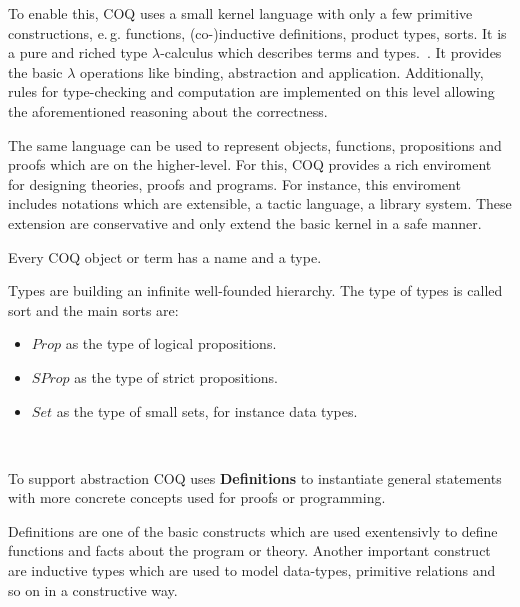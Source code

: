 To enable this, COQ uses a small kernel language with only a few
primitive constructions, e.\,g. functions, (co-)inductive definitions,
product types, sorts. It is a pure and riched type $\lambda$-calculus which
describes terms and types.~\cite{paulinmohring:hal-01094195}.
It provides the basic $\lambda$ operations like binding, abstraction
and application. Additionally, rules for type-checking and computation
are implemented on this level allowing the aforementioned reasoning
about the correctness.~\cite{paulin2011introduction, paulinmohring:hal-01094195}

The same language can be used to represent objects, functions, propositions
and proofs which are on the higher-level. For this, COQ provides a
rich enviroment for designing theories, proofs and programs. For instance,
this enviroment includes notations which are extensible, a tactic language,
a library system. These extension are conservative and only extend the
basic kernel in a safe manner.~\cite{paulin2011introduction}

\begin{defi}
  Every COQ object or term has a name and a type.
\end{defi}

\begin{defi}
  Types are building an infinite well-founded hierarchy.
  The type of types is called sort and the main sorts are:
  \begin{itemize}
  \item $Prop$ as the type of logical propositions.
  \item $SProp$ as the type of strict propositions.
  \item $Set$ as the type of small sets, for instance data types.
  \end{itemize}~\cite{the_coq_development_team_2019_2554024}
\end{defi}

\begin{defi}
  To support abstraction COQ uses \textbf{Definitions} to instantiate
  general statements with more concrete concepts used for proofs
  or programming.~\cite{huet1997coq}
\end{defi}

Definitions are one of the basic constructs which are used exentensivly
to define functions and facts about the program or theory.
Another important construct are inductive types which are used to model
data-types, primitive relations and so on in a constructive way.~\cite{paulin2011introduction}

